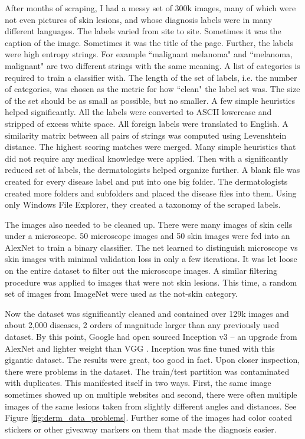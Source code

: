 After months of scraping, I had a messy set of 300k images, many of which were not even pictures of skin lesions, and whose diagnosis labels were in many different languages.  The labels varied from site to site.  Sometimes it was the caption of the image.  Sometimes it was the title of the page.  Further, the labels were high entropy strings.  For example ``malignant melanoma" and ``melanoma, malignant" are two different strings with the same meaning.  A list of categories is required to train a classifier with.  The length of the set of labels, i.e. the number of categories, was chosen as the metric for how ``clean" the label set was.  The size of the set should be as small as possible, but no smaller.  A few simple heuristics helped significantly. All the labels were converted to ASCII lowercase and stripped of excess white space.  All foreign labels were translated to English. A similarity matrix between all pairs of strings was computed using Levenshtein distance.  The highest scoring matches were merged.  Many simple heuristics that did not require any medical knowledge were applied.  Then with a significantly reduced set of labels, the dermatologists helped organize further.  A blank file was created for every disease label and put into one big folder.  The dermatologists created more folders and subfolders and placed the disease files into them.  Using only Windows File Explorer, they created a taxonomy of the scraped labels.

The images also needed to be cleaned up.  There were many images of skin cells under a microscope.  50 microscope images and 50 skin images were fed into an AlexNet to train a binary classifier.  The net learned to distinguish microscope vs skin images with minimal validation loss in only a few iterations.  It was let loose on the entire dataset to filter out the microscope images.  A similar filtering procedure was applied to images that were not skin lesions.  This time, a random set of images from ImageNet were used as the not-skin category.

Now the dataset was significantly cleaned and contained over 129k images and about 2,000 diseases, 2 orders of magnitude larger than any previously used dataset.  By this point, Google had open sourced Inception v3 \cite{szegedy2016rethinking} -- an upgrade from AlexNet \cite{krizhevsky2012imagenet} and lighter weight than VGG \cite{simonyan2014very}.  Inception was fine tuned with this gigantic dataset.  The results were great, too good in fact.  Upon closer inspection, there were problems in the dataset.  The train/test partition was contaminated with duplicates.  This manifested itself in two ways.  First, the same image sometimes showed up on multiple websites and second, there were often multiple images of the same lesions taken from slightly different angles and distances.  See Figure \ref{fig:derm_data_problems}.  Further some of the images had color coated stickers or other giveaway markers on them that made the diagnosis easier.

